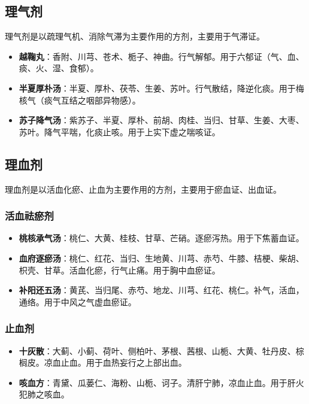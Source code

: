 \documentclass[12pt,UTF8]{ctexbook}
\begin{document}
\subsection{理气剂}

理气剂是以疏理气机、消除气滞为主要作用的方剂，主要用于气滞证。

\begin{itemize}
\item \textbf{越鞠丸}：香附、川芎、苍术、栀子、神曲。行气解郁。用于六郁证（气、血、痰、火、湿、食郁）。
\item \textbf{半夏厚朴汤}：半夏、厚朴、茯苓、生姜、苏叶。行气散结，降逆化痰。用于梅核气（痰气互结之咽部异物感）。
\item \textbf{苏子降气汤}：紫苏子、半夏、厚朴、前胡、肉桂、当归、甘草、生姜、大枣、苏叶。降气平喘，化痰止咳。用于上实下虚之喘咳证。
\end{itemize}

\subsection{理血剂}

理血剂是以活血化瘀、止血为主要作用的方剂，主要用于瘀血证、出血证。

\subsubsection{活血祛瘀剂}

\begin{itemize}
\item \textbf{桃核承气汤}：桃仁、大黄、桂枝、甘草、芒硝。逐瘀泻热。用于下焦蓄血证。
\item \textbf{血府逐瘀汤}：桃仁、红花、当归、生地黄、川芎、赤芍、牛膝、桔梗、柴胡、枳壳、甘草。活血化瘀，行气止痛。用于胸中血瘀证。
\item \textbf{补阳还五汤}：黄芪、当归尾、赤芍、地龙、川芎、红花、桃仁。补气，活血，通络。用于中风之气虚血瘀证。
\end{itemize}

\subsubsection{止血剂}

\begin{itemize}
\item \textbf{十灰散}：大蓟、小蓟、荷叶、侧柏叶、茅根、茜根、山栀、大黄、牡丹皮、棕榈皮。凉血止血。用于血热妄行之上部出血。
\item \textbf{咳血方}：青黛、瓜蒌仁、海粉、山栀、诃子。清肝宁肺，凉血止血。用于肝火犯肺之咳血。
\end{itemize}
\end{document}
